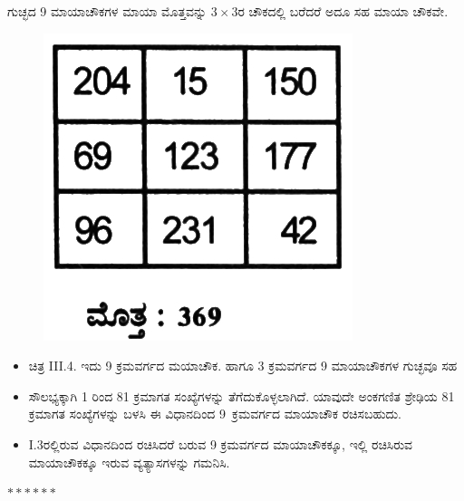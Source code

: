 ಗುಚ್ಛದ 9 ಮಾಯಾಚೌಕಗಳ ಮಾಯಾ ಮೊತ್ತವನ್ನು $3 \times 3$ರ ಚೌಕದಲ್ಲಿ ಬರೆದರೆ ಅದೂ ಸಹ ಮಾಯಾ ಚೌಕವೇ.
\begin{figure}[H]
\includegraphics{src/figures/chap3/fig3-32.jpg}
\end{figure}

\begin{itemize}
	\item ಚಿತ್ರ  III.4. ಇದು 9 ಕ್ರಮವರ್ಗದ ಮಯಾಚೌಕ. ಹಾಗೂ 3 ಕ್ರಮವರ್ಗದ 9 ಮಾಯಾಚೌಕಗಳ ಗುಚ್ಛವೂ ಸಹ
	\item ಸೌಲಭ್ಯಕ್ಕಾಗಿ 1 ರಿಂದ 81 ಕ್ರಮಾಗತ ಸಂಖ್ಯೆಗಳನ್ನು ತೆಗೆದುಕೊಳ್ಳಲಾಗಿದೆ. \hbox{ಯಾವುದೇ} ಅಂಕಗಣಿತ ಶ್ರೇಢಿಯ 81 ಕ್ರಮಾಗತ ಸಂಖ್ಯೆಗಳನ್ನು ಬಳಸಿ ಈ ವಿಧಾನದಿಂದ \hbox{9 ಕ್ರಮವರ್ಗದ} ಮಾಯಾಚೌಕ ರಚಿಸಬಹುದು.
	\item I.3ರಲ್ಲಿರುವ ವಿಧಾನದಿಂದ ರಚಿಸಿದರೆ ಬರುವ 9 ಕ್ರಮವರ್ಗದ ಮಾಯಾಚೌಕಕ್ಕೂ, ಇಲ್ಲಿ ರಚಿಸಿರುವ ಮಾಯಾಚೌಕಕ್ಕೂ ಇರುವ ವ್ಯತ್ಯಾಸಗಳನ್ನು ಗಮನಿಸಿ.
\end{itemize}

\begin{center}
$******$
\end{center}

